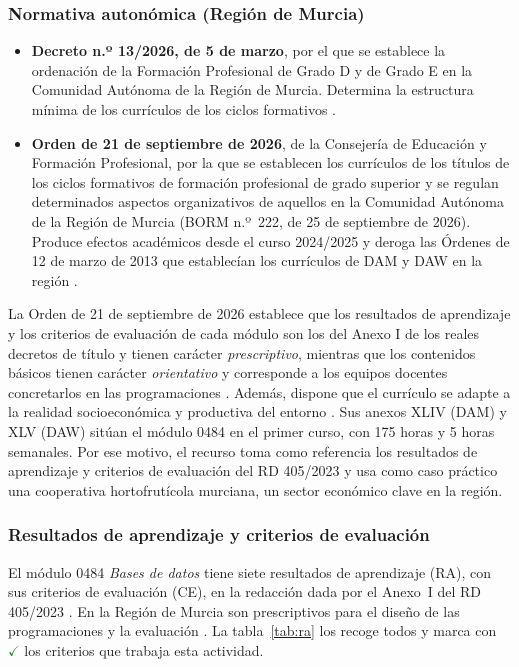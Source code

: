 \documentclass[11pt,a4paper]{article}
\newcommand{\trab}{\textcolor{ForestGreen}{\ensuremath{\checkmark}}}
\begin{document}
\subsubsection{Normativa autonómica (Región de Murcia)}

\begin{itemize}
  \item \textbf{Decreto n.º 13/2026, de 5 de marzo}, por el que se establece la ordenación
        de la Formación Profesional de Grado D y de Grado E en la Comunidad Autónoma de la
        Región de Murcia. Determina la estructura mínima de los currículos de los ciclos
        formativos \cite{decreto13}.
  \item \textbf{Orden de 21 de septiembre de 2026}, de la Consejería de Educación y Formación
        Profesional, por la que se establecen los currículos de los títulos de los ciclos
        formativos de formación profesional de grado superior y se regulan determinados
        aspectos organizativos de aquellos en la Comunidad Autónoma de la Región de Murcia
        (BORM n.º~222, de 25 de septiembre de 2026). Produce efectos académicos desde el
        curso 2024/2025 y deroga las Órdenes de 12 de marzo de 2013 que establecían los
        currículos de DAM y DAW en la región \cite{murcia2026}.
\end{itemize}

La Orden de 21 de septiembre de 2026 establece que los resultados de aprendizaje y los
criterios de evaluación de cada módulo son los del Anexo I de los reales decretos de
título y tienen carácter \emph{prescriptivo}, mientras que los contenidos básicos tienen
carácter \emph{orientativo} y corresponde a los equipos docentes concretarlos en las
programaciones \cite[art.~3]{murcia2026}. Además, dispone que el currículo se adapte a la
realidad socioeconómica y productiva del entorno \cite[art.~4]{murcia2026}. Sus anexos
XLIV (DAM) y XLV (DAW) sitúan el módulo 0484 en el primer curso, con 175 horas y
5 horas semanales. Por ese motivo, el recurso toma como referencia los resultados de
aprendizaje y criterios de evaluación del RD 405/2023 y usa como caso práctico una
cooperativa hortofrutícola murciana, un sector económico clave en la región.

\subsubsection{Resultados de aprendizaje y criterios de evaluación}
\label{sec:ra}

El módulo 0484 \emph{Bases de datos} tiene siete resultados de aprendizaje (RA), con sus
criterios de evaluación (CE), en la redacción dada por el Anexo~I del RD 405/2023
\cite{rd405}. En la Región de Murcia son prescriptivos para el diseño de las programaciones y
la evaluación \cite[art.~3]{murcia2026}. La tabla~\ref{tab:ra} los recoge todos y marca con
\trab{} los criterios que trabaja esta actividad.
\end{document}
